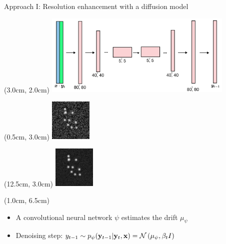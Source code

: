 \documentclass{beamer}					%
\begin{document}
\begin{frame}{Approach I: Resolution enhancement with a diffusion model}
\begin{textblock*}{9cm}(3.0cm, 2.0cm)
\includegraphics[width=9cm]{../../phd/ddpm/ddpm/media/DiffusionArch.png}
\end{textblock*}
\begin{textblock*}{2cm}(0.5cm, 3.0cm)
\includegraphics[width=2cm]{../../phd/dissertation/dissertation/media/diffusion_example/0_1_sr_79.png}
\end{textblock*}
\begin{textblock*}{2cm}(12.5cm, 3.0cm)
\includegraphics[width=2cm]{../../phd/dissertation/dissertation/media/diffusion_example/0_1_sr_99.png}
\end{textblock*}

\begin{textblock*}{13cm}(1.0cm, 6.5cm)
\begin{itemize}
\item A convolutional neural network $\psi$ estimates the drift $\mu_{\psi}$
\item Denoising step: $y_{t-1}\sim p_{\psi}(\bold{y}_{t-1}|\bold{y}_{t},\bold{x}) = \mathcal{N}\left(\mu_{\psi},\beta_{t}I\right)$
\end{itemize}
\end{textblock*}
\end{frame}
\end{document}
